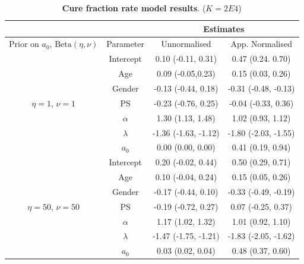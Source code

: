 \documentclass[a4paper, notitlepage, 11pt]{article}
\begin{document}
\begin{table}[!ht]
\caption{\textbf{Cure fraction rate model results}. ($K = 2E4$)}
\begin{tabular}{cccc}
\hline
                                            &           & \multicolumn{2}{c}{Estimates}                      \\ \hline
Prior on $a_0$, $\text{Beta}(\eta, \nu)$    & Parameter & Unnormalised         & App. Normalised  \\
\hline
\multirow{7}{*}{$\eta = 1$, $\nu  = 1$}     & Intercept & 0.10 (-0.11, 0.31)   & 0.47 (0.24. 0.70)           \\
                                            & Age       & 0.09 (-0.05,0.23)    & 0.15 (0.03, 0.26)           \\
                                            & Gender    & -0.13 (-0.44, 0.18)  & -0.31 (-0.48, -0.13)        \\
                                            & PS        & -0.23 (-0.76, 0.25)  & -0.04 (-0.33, 0.36)         \\
                                            & $\alpha$  & 1.30 (1.13, 1.48)    & 1.02 (0.93, 1.12)           \\
                                            & $\lambda$ & -1.36 (-1.63, -1.12) & -1.80 (-2.03, -1.55)        \\
                                            & $a_0$     & 0.00 (0.00, 0.00)    & 0.41 (0.19, 0.94)           \\
\multirow{7}{*}{$\eta = 50$, $\nu  = 50$}   & Intercept & 0.20 (-0.02, 0.44)   & 0.50 (0.29, 0.71)           \\
                                            & Age       & 0.10 (-0.04, 0.24)   & 0.15 (0.05, 0.26)           \\
                                            & Gender    & -0.17 (-0.44, 0.10)  & -0.33 (-0.49, -0.19)         \\
                                            & PS        & -0.19 (-0.72, 0.27)  & 0.07 (-0.25, 0.37)          \\
                                            & $\alpha$  & 1.17 (1.02, 1.32)    & 1.01 (0.92, 1.10)           \\
                                            & $\lambda$ & -1.47 (-1.75, -1.21) & -1.83 (-2.05, -1.62)        \\
                                            & $a_0$     & 0.03 (0.02, 0.04)    & 0.48 (0.37, 0.60)           \\

\end{tabular}
\end{table}
\end{document}

